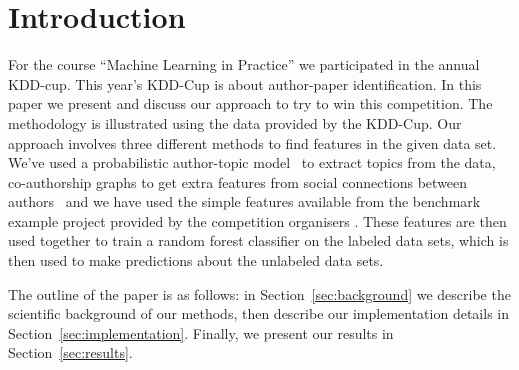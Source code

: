 \section{Introduction}

For the course ``Machine Learning in Practice'' we participated in the annual KDD-cup.
This year's KDD-Cup is about author-paper identification.
In this paper we present and discuss our approach to try to win this competition.
The methodology is illustrated using the data provided by the KDD-Cup.
Our approach involves three different methods to find features in the given data set.
We've used a probabilistic author-topic model~\cite{steyvers2004probabilistic} to extract topics from  the data, co-authorship graphs to get extra features from social connections between authors~\cite{liu2005co} and we have used the simple features available from the benchmark example project provided by the competition organisers \cite{kddcupsite}.
These features are then used together to train a random forest classifier on the labeled data sets, which is then used to make predictions about the unlabeled data sets.

The outline of the paper is as follows: in Section~\ref{sec:background} we describe the scientific background of our methods, then describe our implementation details in Section~\ref{sec:implementation}. Finally, we present our results in Section~\ref{sec:results}.

